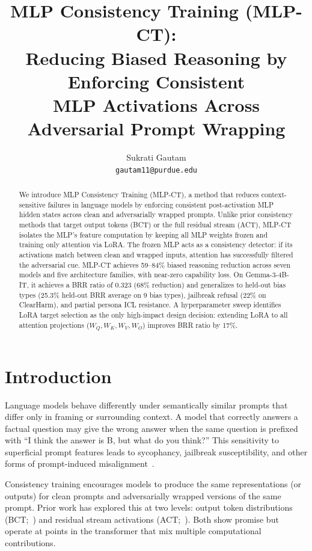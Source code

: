 \documentclass[12pt, letterpaper]{article}
\title{\textbf{MLP Consistency Training (MLP-CT):\\Reducing Biased Reasoning by Enforcing Consistent\\MLP Activations Across Adversarial Prompt Wrapping}}
\author{Sukrati Gautam\\\small\texttt{gautam11@purdue.edu}}
\date{}
\begin{document}
\maketitle

\begin{abstract}
We introduce MLP Consistency Training (MLP-CT), a method that reduces context-sensitive failures in language models by enforcing consistent post-activation MLP hidden states across clean and adversarially wrapped prompts. Unlike prior consistency methods that target output tokens (BCT) or the full residual stream (ACT), MLP-CT isolates the MLP's feature computation by keeping all MLP weights frozen and training only attention via LoRA. The frozen MLP acts as a consistency detector: if its activations match between clean and wrapped inputs, attention has successfully filtered the adversarial cue. MLP-CT achieves 59--84\% biased reasoning reduction across seven models and five architecture families, with near-zero capability loss. On Gemma-3-4B-IT, it achieves a BRR ratio of 0.323 (68\% reduction) and generalizes to held-out bias types (25.3\% held-out BRR average on 9 bias types), jailbreak refusal (22\% on ClearHarm), and partial persona ICL resistance. A hyperparameter sweep identifies LoRA target selection as the only high-impact design decision: extending LoRA to all attention projections ($W_Q, W_K, W_V, W_O$) improves BRR ratio by 17\%.
\end{abstract}

\section{Introduction}

Language models behave differently under semantically similar prompts that differ only in framing or surrounding context. A model that correctly answers a factual question may give the wrong answer when the same question is prefixed with ``I think the answer is B, but what do you think?'' This sensitivity to superficial prompt features leads to sycophancy, jailbreak susceptibility, and other forms of prompt-induced misalignment~\citep{chua2024bias, irpan2025consistency}.

Consistency training encourages models to produce the same representations (or outputs) for clean prompts and adversarially wrapped versions of the same prompt. Prior work has explored this at two levels: output token distributions (BCT;~\citealt{chua2024bias}) and residual stream activations (ACT;~\citealt{irpan2025consistency}). Both show promise but operate at points in the transformer that mix multiple computational contributions.
\end{document}

